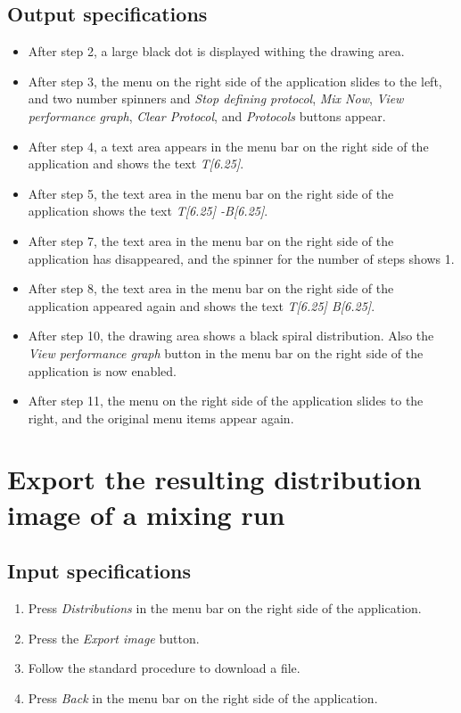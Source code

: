 \subsection*{Output specifications}
\begin{itemize}
\item After step 2, a large black dot is displayed withing the drawing area.
\item After step 3, the menu on the right side of the application slides to the left, and two number spinners and \emph{Stop defining protocol}, \emph{Mix Now}, \emph{View performance graph}, \emph{Clear Protocol}, and \emph{Protocols} buttons appear.
\item After step 4, a text area appears in the menu bar on the right side of the application and shows the text \emph{T[6.25]}.
\item After step 5, the text area in the menu bar on the right side of the application shows the text \emph{T[6.25] -B[6.25]}.

\item After step 7, the text area in the menu bar on the right side of the application has disappeared, and the spinner for the number of steps shows 1.
\item After step 8, the text area in the menu bar on the right side of the application appeared again and shows the text \emph{T[6.25] B[6.25]}.
\item After step 10, the drawing area shows a black spiral distribution. Also the \emph{View performance graph} button in the menu bar on the right side of the application is now enabled.

\item After step 11, the menu on the right side of the application slides to the right, and the original menu items appear again.
\end{itemize}

\section{Export the resulting distribution image of a mixing run}

\subsection*{Input specifications}
\begin{enumerate}
\item Press \emph{Distributions} in the menu bar on the right side of the application.
\item Press the \emph{Export image} button.
\item Follow the standard procedure to download a file.
\item Press \emph{Back} in the menu bar on the right side of the application.
\end{enumerate}

